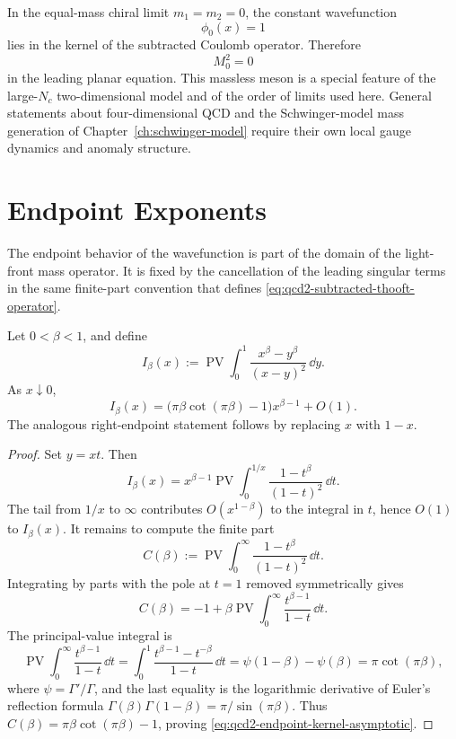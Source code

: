 In the equal-mass chiral limit \(m_1=m_2=0\), the constant wavefunction
\[
  \phi_0(x)=1
\]
lies in the kernel of the subtracted Coulomb operator.  Therefore
\[
  M_0^2=0
\]
in the leading planar equation.  This massless meson is a special feature of
the large-\(N_c\) two-dimensional model and of the order of limits used here.
General statements about four-dimensional QCD and the Schwinger-model mass
generation of Chapter~\ref{ch:schwinger-model} require their own local gauge
dynamics and anomaly structure.

\section{Endpoint Exponents}
\label{sec:qcd2-endpoint-exponents}

The endpoint behavior of the wavefunction is part of the domain of the
light-front mass operator.  It is fixed by the cancellation of the leading
singular terms in the same finite-part convention that defines
\eqref{eq:qcd2-subtracted-thooft-operator}.

\begin{lemma}
\label{lem:qcd2-endpoint-finite-part}
Let \(0<\beta<1\), and define
\[
  I_\beta(x)
  :=
  \operatorname{PV}\int_0^1
  \frac{x^\beta-y^\beta}{(x-y)^2}\,\dd y .
\]
As \(x\downarrow0\),
\begin{equation}
  I_\beta(x)
  =
  \bigl(\pi\beta\cot(\pi\beta)-1\bigr)x^{\beta-1}
  +O(1).
  \label{eq:qcd2-endpoint-kernel-asymptotic}
\end{equation}
The analogous right-endpoint statement follows by replacing \(x\) with
\(1-x\).
\end{lemma}

\begin{proof}
Set \(y=xt\).  Then
\[
  I_\beta(x)
  =
  x^{\beta-1}
  \operatorname{PV}\int_0^{1/x}
  \frac{1-t^\beta}{(1-t)^2}\,\dd t .
\]
The tail from \(1/x\) to \(\infty\) contributes \(O(x^{1-\beta})\) to the
integral in \(t\), hence \(O(1)\) to \(I_\beta(x)\).  It remains to compute
the finite part
\[
  C(\beta):=
  \operatorname{PV}\int_0^\infty
  \frac{1-t^\beta}{(1-t)^2}\,\dd t .
\]
Integrating by parts with the pole at \(t=1\) removed symmetrically gives
\[
  C(\beta)
  =
  -1+\beta\operatorname{PV}\int_0^\infty
  \frac{t^{\beta-1}}{1-t}\,\dd t .
\]
The principal-value integral is
\[
  \operatorname{PV}\int_0^\infty
  \frac{t^{\beta-1}}{1-t}\,\dd t
  =
  \int_0^1\frac{t^{\beta-1}-t^{-\beta}}{1-t}\,\dd t
  =
  \psi(1-\beta)-\psi(\beta)
  =
  \pi\cot(\pi\beta),
\]
where \(\psi=\Gamma'/\Gamma\), and the last equality is the logarithmic
derivative of Euler's reflection formula
\(\Gamma(\beta)\Gamma(1-\beta)=\pi/\sin(\pi\beta)\).  Thus
\(C(\beta)=\pi\beta\cot(\pi\beta)-1\), proving
\eqref{eq:qcd2-endpoint-kernel-asymptotic}.
\end{proof}

